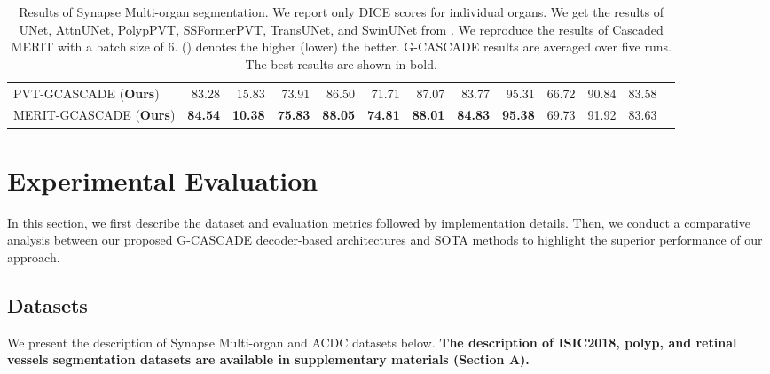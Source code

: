 \documentclass[10pt,twocolumn,letterpaper]{article}
\begin{document}
\begin{table*}[]
\begin{center}
{{\begin{tabular}{lrrrrrrrrrrrr}
\midrule
PVT-GCASCADE (\textbf{Ours})                 & 83.28                   &   15.83                  &  73.91                         &   86.50                                    &  71.71                                  &   87.07                                      &   83.77                                    &  95.31                                   &   66.72                                &   90.84                                & 83.58
\\
MERIT-GCASCADE (\textbf{Ours})                 & \textbf{84.54}                   & \textbf{10.38}                    & \textbf{75.83}                           &  \textbf{88.05}                                     &    \textbf{74.81}                                & \textbf{88.01}                                        & \textbf{84.83}                                        & \textbf{95.38}                                      & 69.73                                   & 91.92                                   & 83.63
\\
\bottomrule \end{tabular}
}}
\end{center}
\caption{Results of Synapse Multi-organ segmentation. We report only DICE scores for individual organs. We get the results of UNet, AttnUNet, PolypPVT, SSFormerPVT, TransUNet, and SwinUNet from \cite{Rahman_2023_WACV}. We reproduce the results of Cascaded MERIT with a batch size of 6.  () denotes the higher (lower) the better. G-CASCADE results are averaged over five runs. The best results are shown in bold.}
\label{tab:multi_organ_results}
\end{table*}

\section{Experimental Evaluation}
\label{sec:experiments}
In this section, we first describe the dataset and evaluation metrics followed by implementation details. Then, we conduct a comparative analysis between our proposed G-CASCADE decoder-based architectures and SOTA methods to highlight the superior performance of our approach.

\subsection{Datasets}
\label{ssec:dataset_metrics}
We present the description of Synapse Multi-organ and ACDC datasets below. \textbf{The description of ISIC2018, polyp, \color{black}and retinal vessels segmentation \color{black}datasets are available in supplementary materials (Section A).}
\end{document}
